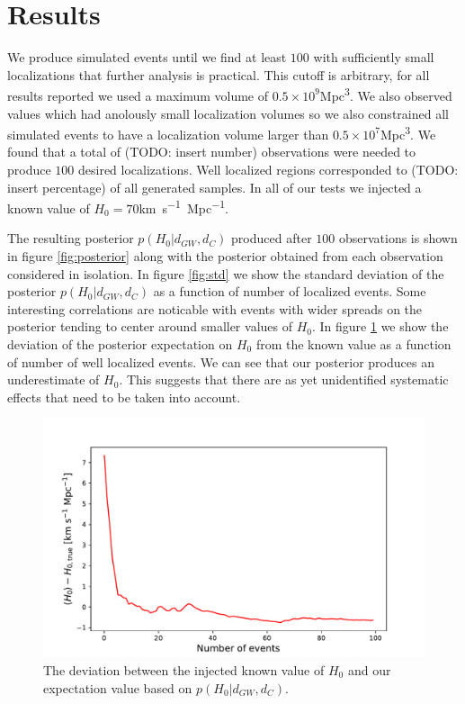 \section{Results} \label{sec:conclusions}
We produce simulated events until we find at least $100$ with sufficiently small localizations that further analysis is practical. This cutoff is arbitrary, for all results reported we used a maximum volume of $0.5\times 10^{9}$\si{Mpc^3}. We also observed values which had anolously small localization volumes so we also constrained all simulated events to have a localization volume larger than $0.5\times 10^{7}$\si{Mpc^3}. We found that a total of (TODO: insert number) observations were needed to produce $100$ desired localizations. Well localized regions corresponded to (TODO: insert percentage) of all generated samples. In all of our tests we injected a known value of $H_0=70$\si{km.s^{-1}.Mpc^{-1}}.

The resulting posterior $p(H_0 | d_{GW}, d_C)$ produced after $100$ observations is shown in figure \ref{fig:posterior} along with the posterior obtained from each observation considered in isolation. In figure \ref{fig:std} we show the standard deviation of the posterior $p(H_0 | d_{GW}, d_C)$ as a function of number of localized events. Some interesting correlations are noticable with events with wider spreads on the posterior tending to center around smaller values of $H_0$. In figure \ref{fig:mean_diff} we show the deviation of the posterior expectation on $H_0$ from the known value as a function of number of well localized events. We can see that our posterior produces an underestimate of $H_0$. This suggests that there are as yet unidentified systematic effects that need to be taken into account. 

\begin{figure}
    \centering
    \includegraphics[width=0.95\columnwidth]{figures/diff.pdf}
    \caption{The deviation between the injected known value of $H_0$ and our expectation value based on $p(H_0 | d_{GW}, d_C)$.}
    \label{fig:mean_diff}
\end{figure}


